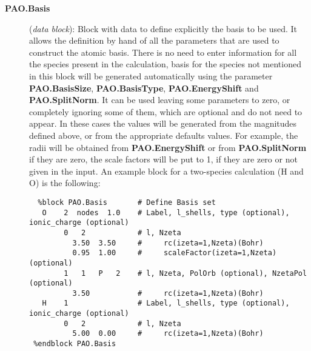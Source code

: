 \begin{description}
\item[{\bf PAO.Basis}] ({\it data block}): 
Block with data to define explicitly the basis to be used. 
It allows the definition by hand of all the parameters that
are used to construct the atomic basis. There is no need
to enter information for all the species present in the calculation,
basis for the species not mentioned in this block will be 
generated automatically using the parameter {\bf PAO.BasisSize},
{\bf PAO.BasisType}, {\bf PAO.EnergyShift} and {\bf PAO.SplitNorm}.
It can be used 
leaving some parameters to zero, or completely ignoring some of them, 
which are optional and do not need to appear.
In these cases the values will be
generated from the magnitudes defined above, or from the appropriate 
defaults values. For example, the radii 
will be obtained from
{\bf PAO.EnergyShift} or from {\bf PAO.SplitNorm} if they are zero,  
the scale
factors will be put to 1, if they are zero or not given in the input. 
An example block for a two-species calculation (H and O) is the following:
\begin{verbatim}
  %block PAO.Basis       # Define Basis set
   O    2  nodes  1.0    # Label, l_shells, type (optional), ionic_charge (optional)
        0   2            # l, Nzeta
          3.50  3.50     #     rc(izeta=1,Nzeta)(Bohr)
          0.95  1.00     #     scaleFactor(izeta=1,Nzeta) (optional)
        1   1   P   2    # l, Nzeta, PolOrb (optional), NzetaPol (optional)
          3.50           #     rc(izeta=1,Nzeta)(Bohr)
   H    1                # Label, l_shells, type (optional), ionic_charge (optional)
        0   2            # l, Nzeta
          5.00  0.00     #     rc(izeta=1,Nzeta)(Bohr)
 %endblock PAO.Basis
\end{verbatim}


\end{description}
